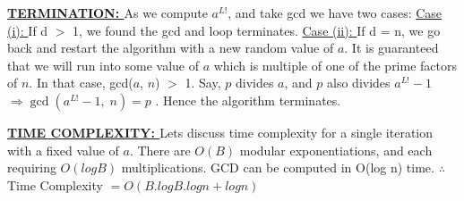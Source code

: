 \documentclass[11pt]{article}
\begin{document}
\begin{flushleft}
    \textbf{\underline{TERMINATION: }}
        \break
        As we compute $a^{L!}$, and take gcd we have two cases:\break
        \underline{Case (i): } If d $>$ 1, we found the gcd and loop terminates.\break
        \underline{Case (ii): } If d = n, we go back and restart the algorithm with a new random value of $a$. It is guaranteed that we will run into some value of $a$ which is multiple of one of the prime factors of $n$. In that case, gcd($a$, $n$) $>$ 1. Say, $p$ divides $a$, and $p$ also divides $a^{L!}-1$
        $\Rightarrow \gcd \left( a^{L!}-1, \;n\right) = p$ . Hence the algorithm terminates.
        
        
        \break\break
        \textbf{\underline{TIME COMPLEXITY: }}
        \break
        Lets discuss time complexity for a single iteration with a fixed value of $a$.\break
        There are $O\left( B\right)$ modular exponentiations, and each requiring $O\left(log B\right)$ multiplications. GCD can be computed in O(log n) time.
        \break
        $ \therefore$ Time Complexity $= O(B. log B. log n + log n) $
\end{flushleft}


\end{document}
